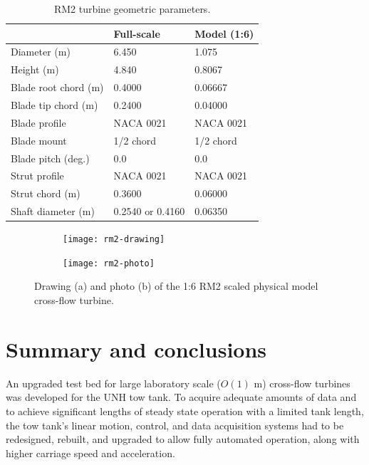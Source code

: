 \begin{table}[ht]
    \centering
    \begin{tabular}{l|l|l}
        & Full-scale & Model (1:6) \\
        \hline 
        Diameter (m)   & 6.450 & 1.075 \\ 
        Height (m)     & 4.840 & 0.8067 \\ 
        Blade root chord (m) & 0.4000 & 0.06667 \\ 
        Blade tip chord (m)  & 0.2400 & 0.04000 \\ 
        Blade profile & NACA 0021 & NACA 0021 \\ 
        Blade mount & 1/2 chord & 1/2 chord \\ 
        Blade pitch (deg.) & 0.0 & 0.0 \\ 
        Strut profile & NACA 0021 & NACA 0021 \\ 
        Strut chord (m) & 0.3600 & 0.06000 \\ 
        Shaft diameter (m) & 0.2540 \cite{Beam2011} or 0.4160 \cite{Hill2014} & 0.06350\\ 
    \end{tabular}
    \caption{RM2 turbine geometric parameters.}
    \label{tab:turb-geom}
\end{table}

\begin{figure}[ht]
    \centering
    
    \begin{subfigure}{0.53\textwidth}
        \texttt{[image: rm2-drawing]}
        \caption{}
        \label{fig:rm2-drawing}
    \end{subfigure}
    \begin{subfigure}{0.41\textwidth}
        \texttt{[image: rm2-photo]}
        \caption{}
        \label{fig:rm2-photo}
    \end{subfigure}
    
    \caption{Drawing (a) and photo (b) of the 1:6 RM2 scaled physical model cross-flow turbine.}
    \label{fig:rm2}
\end{figure}


\section{Summary and conclusions}

An upgraded test bed for large laboratory scale ($O(1)$ m) cross-flow turbines
was developed for the UNH tow tank. To acquire adequate amounts of data and to
achieve significant lengths of steady state operation with a limited tank
length, the tow tank's linear motion, control, and data acquisition systems had
to be redesigned, rebuilt, and upgraded to allow fully automated operation,
along with higher carriage speed and acceleration.

